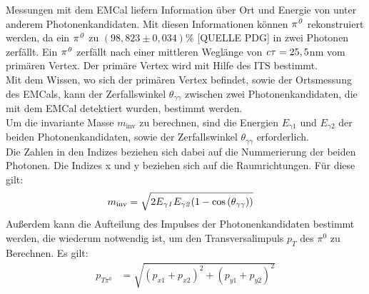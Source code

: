 Messungen mit dem EMCal liefern Information {\"u}ber Ort und Energie von unter anderem Photonenkandidaten. Mit diesen Informationen k{\"o}nnen ${\it \pi^{0}}$ rekonstruiert werden, da ein ${\it \pi^{0}}$ zu $\left( 98,823\pm0,034\right)\%$ [QUELLE PDG] in zwei Photonen zerf{\"a}llt. Ein ${\it \pi^{0}}$ zerf{\"a}llt nach einer mittleren Wegl{\"a}nge von ${\it c\tau} = 25,5$nm vom prim{\"a}ren Vertex. Der prim{\"a}re Vertex wird mit Hilfe des ITS bestimmt. \\
Mit dem Wissen, wo sich der prim{\"a}ren Vertex befindet, sowie der Ortsmessung des EMCals, kann der Zerfallswinkel $\theta_{\gamma\gamma}$ zwischen zwei Photonenkandidaten, die mit dem EMCal detektiert wurden, bestimmt werden. \\ 
Um die invariante Masse $m_{\text{inv}}$ zu berechnen, sind die Energien $E_{\gamma1}$ und $E_{\gamma2}$ der beiden Photonenkandidaten, sowie der Zerfallswinkel $\theta_{\gamma\gamma}$ erforderlich. \\
Die Zahlen in den Indizes beziehen sich dabei auf die Nummerierung der beiden Photonen. Die Indizes x und y beziehen sich auf die Raumrichtungen. F{\"u}r diese gilt:
\begin{align}
m_{\text{inv}} &= \sqrt{2E_{\gamma\it{1}}E_{\gamma\it{2}}(1-\cos\left( \theta_{\gamma\gamma}\right) )} \label{eq_invmass}
\end{align}
Au{\ss}erdem kann die Aufteilung des Impulses der Photonenkandidaten bestimmt werden, die wiederum notwendig ist, um den Transversalimpuls $p_{T}$ des $\pi^{0}$ zu Berechnen. Es gilt:
\begin{align}
p_{T\pi^{0}} &= \sqrt{\left(p_{x1}+p_{x2}\right)^{2} +\left(p_{y1}+p_{y2}\right)^{2}} \label{eq_pt}
\end{align}
